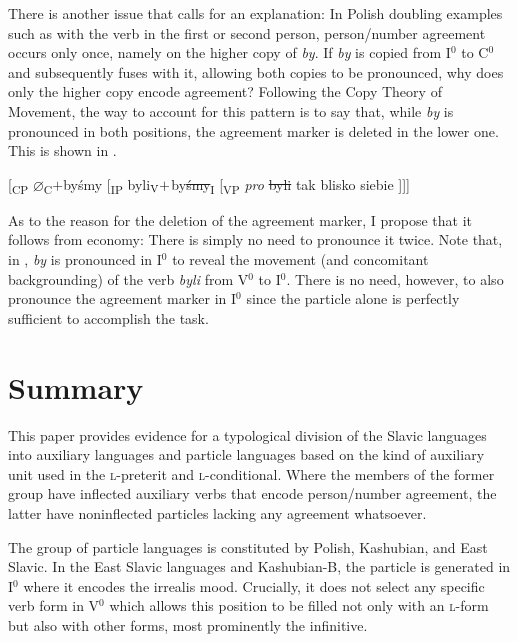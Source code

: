 \documentclass[output=paper]{langscibook}
\begin{document}
There is another issue that calls for an explanation: In Polish doubling examples such as  with the verb in the first or second person, person/number agreement occurs only once, namely on the higher copy of \textit{by}. If \textit{by} is copied from I$^0$ to C$^0$ and subsequently fuses with it, allowing both copies to be pronounced, why does only the higher copy encode agreement? Following the Copy Theory of Movement, the way to account for this pattern is to say that, while \textit{by} is pronounced in both positions, the agreement marker is deleted in the lower one. This is shown in . 

\ea
{[}\textsubscript{CP} $\varnothing$\textsubscript{C}$+$byśmy [\textsubscript{IP} byli$\textsubscript{V}+$by\sout{śmy}\textsubscript{I} [\textsubscript{VP} \textit{pro} \sout{byli} tak blisko siebie ]]]
\label{pitsch:ex:doubling_Polish_coll_b_analysis}
\z

\noindent As to the reason for the deletion of the agreement marker, I propose that it follows from economy: There is simply no need to pronounce it twice. Note that, in , \textit{by} is pronounced in I$^0$ to reveal the movement (and concomitant backgrounding) of the verb \textit{byli} from V$^0$ to I$^0$. There is no need, however, to also pronounce the agreement marker in I$^0$ since the particle alone is perfectly sufficient to accomplish the task.


\section{Summary}\label{pitsch:sec:summary}

This paper provides evidence for a typological division of the Slavic languages into auxiliary languages and particle languages based on the kind of auxiliary unit used in the \textsc{l-}preterit and \textsc{l-}conditional. Where the members of the former group have inflected auxiliary verbs that encode person/number agreement, the latter have noninflected particles lacking any agreement whatsoever.

The group of particle languages is constituted by Polish, Kashubian, and East Slavic. In the East Slavic languages and Kashubian-B, the particle is generated in I$^0$ where it encodes the irrealis mood. Crucially, it does not select any specific verb form in V$^0$ which allows this position to be filled not only with an \textsc{l-}form but also with other forms, most prominently the infinitive. 
\end{document}
